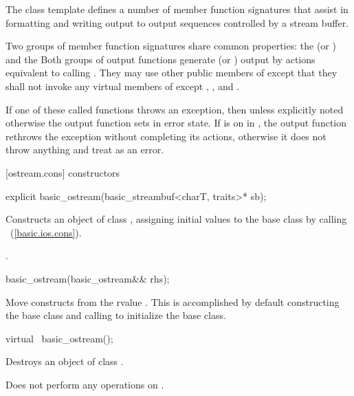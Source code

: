 \pnum
The class template
defines a number of member function
signatures that assist in formatting and writing output to output sequences
controlled by a stream buffer.

\pnum
Two groups of member function signatures share common properties:
the
(or
)
and the
Both groups of output functions generate (or
)
output
by actions equivalent to calling
.
They may use other public members of
except that they shall not invoke any virtual members of
except
,
,
and
.

\pnum
If one of these called functions throws an exception, then unless explicitly noted otherwise
the output function sets
in error state.
If
is on in
,
the output function
rethrows the exception without completing its actions, otherwise
it does not throw anything and treat as an error.

[ostream.cons]{ constructors}

%
\begin{itemdecl}
explicit basic_ostream(basic_streambuf<charT, traits>* sb);
\end{itemdecl}

%
\begin{itemdescr}
\pnum
\effects
Constructs an object of class
,
assigning initial values to the base class by calling
~(\ref{basic.ios.cons}).

\pnum
\postconditions
{}.

%
\begin{itemdecl}
basic_ostream(basic_ostream&& rhs);
\end{itemdecl}

\begin{itemdescr}
\pnum
\effects Move constructs from the rvalue .
This is accomplished by default constructing the base class and calling
 to initialize the
base class.
\end{itemdescr}

%
\begin{itemdecl}
virtual ~basic_ostream();
\end{itemdecl}

\pnum
\effects
Destroys an object of class
.

\pnum
\remarks
Does not perform any operations on
.
\end{itemdescr}


